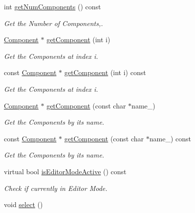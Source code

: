 \begin{DoxyCompactItemize}
\item 
int \hyperlink{class_i_dream_sky_1_1_component_1_1_owner_a936488a8c0a2e5eca370ca4112be7f11}{get\+Num\+Components} () const 
\begin{DoxyCompactList}\small\item\em Get the Number of Components,. \end{DoxyCompactList}\item 
\hyperlink{class_i_dream_sky_1_1_component}{Component} $\ast$ \hyperlink{class_i_dream_sky_1_1_component_1_1_owner_abed74294c87ac3b84663441feb20f5a7}{get\+Component} (int i)
\begin{DoxyCompactList}\small\item\em Get the Components at index i. \end{DoxyCompactList}\item 
const \hyperlink{class_i_dream_sky_1_1_component}{Component} $\ast$ \hyperlink{class_i_dream_sky_1_1_component_1_1_owner_aa658bf4938f0216a0db979c6324f9666}{get\+Component} (int i) const 
\begin{DoxyCompactList}\small\item\em Get the Components at index i. \end{DoxyCompactList}\item 
\hyperlink{class_i_dream_sky_1_1_component}{Component} $\ast$ \hyperlink{class_i_dream_sky_1_1_component_1_1_owner_a098a31b0eb76e8f6c661cd9542866a3d}{get\+Component} (const char $\ast$name\+\_\+)
\begin{DoxyCompactList}\small\item\em Get the Components by its name. \end{DoxyCompactList}\item 
const \hyperlink{class_i_dream_sky_1_1_component}{Component} $\ast$ \hyperlink{class_i_dream_sky_1_1_component_1_1_owner_ab574cb2132f012f7400ef489aefa4005}{get\+Component} (const char $\ast$name\+\_\+) const 
\begin{DoxyCompactList}\small\item\em Get the Components by its name. \end{DoxyCompactList}\item 
virtual bool \hyperlink{class_i_dream_sky_1_1_component_1_1_owner_abf13c26d4fc4c07fad6893aac99bad3d}{is\+Editor\+Mode\+Active} () const 
\begin{DoxyCompactList}\small\item\em Check if currently in Editor Mode. \end{DoxyCompactList}\item 
void \hyperlink{class_i_dream_sky_1_1_component_1_1_owner_a87291f87dfe3a340fd4983ccfcfa9c50}{select} ()\hypertarget{class_i_dream_sky_1_1_component_1_1_owner_a87291f87dfe3a340fd4983ccfcfa9c50}{}\label{class_i_dream_sky_1_1_component_1_1_owner_a87291f87dfe3a340fd4983ccfcfa9c50}


\end{DoxyCompactItemize}
